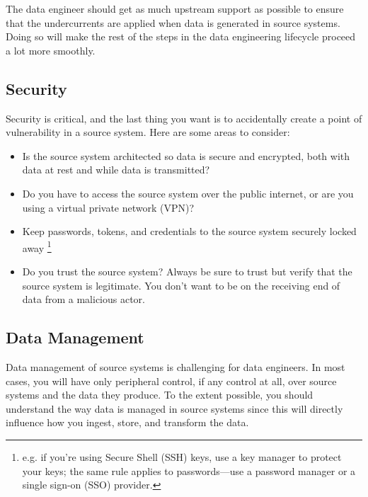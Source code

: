 The data engineer should get as much upstream support as possible
to ensure that the undercurrents are applied when data is
generated in source systems. Doing so will make the rest of the
steps in the data engineering lifecycle proceed a lot more
smoothly.


\subsection*{Security}
Security is critical, and the last thing you want is to
accidentally create a point of vulnerability in a source system.
Here are some areas to consider:
\begin{itemize}
    \item Is the source system architected so data is secure and
    encrypted, both with data at rest and while data is
    transmitted?

    \item Do you have to access the source system over the public
    internet, or are you using a virtual private network (VPN)?

    \item Keep passwords, tokens, and credentials to the source
    system securely locked away
    \footnote{
        e.g. if you're using Secure Shell (SSH) keys, use a key
        manager to protect your keys; the same rule applies to
        passwords—use a password manager or a single sign-on
        (SSO) provider.
    }
    
    \item Do you trust the source system? Always be sure to trust
    but verify that the source system is legitimate. You don't
    want to be on the receiving end of data from a malicious actor.
\end{itemize}



\subsection*{Data Management}
Data management of source systems is challenging for data
engineers. In most cases, you will have only peripheral
control, if any control at all, over source systems and
the data they produce. To the extent possible, you should
understand the way data is managed in source systems since
this will directly influence how you ingest, store, and transform
the data.

